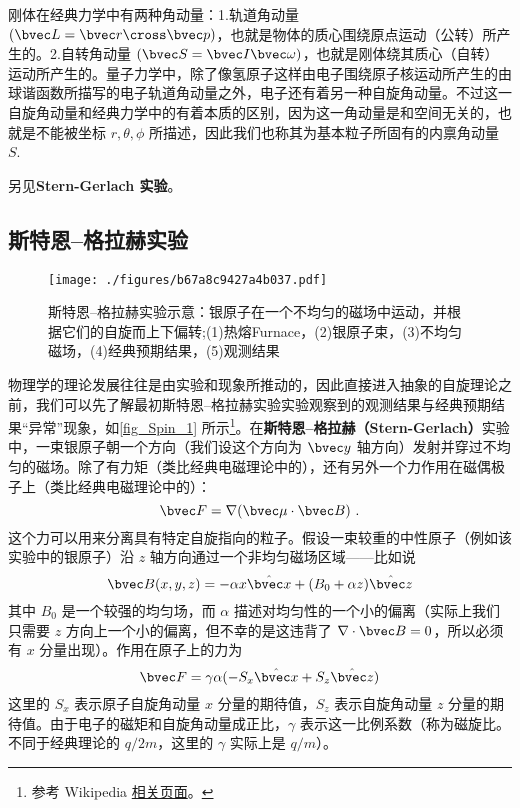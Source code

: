 
\begin{issues}
\issueDraft
\end{issues}


刚体在经典力学中有两种角动量：1.轨道角动量 $(\bvec L = \bvec r\cross\bvec p)$，也就是物体的质心围绕原点运动（公转）所产生的。2.自转角动量 $(\bvec S = \bvec I\bvec\omega)$，也就是刚体绕其质心（自转）运动所产生的。量子力学中，除了像氢原子这样由电子围绕原子核运动所产生的由球谐函数所描写的电子轨道角动量之外，电子还有着另一种自旋角动量。不过这一自旋角动量和经典力学中的有着本质的区别，因为这一角动量是和空间无关的，也就是不能被坐标 $r,\theta,\phi$ 所描述，因此我们也称其为基本粒子所固有的内禀角动量 $S$. 

另见\textbf{Stern-Gerlach 实验}。

\subsection{斯特恩–格拉赫实验}
\begin{figure}[ht]
\centering
\texttt{[image: ./figures/b67a8c9427a4b037.pdf]}
\caption{斯特恩–格拉赫实验示意：银原子在一个不均匀的磁场中运动，并根据它们的自旋而上下偏转;(1)热熔Furnace，(2)银原子束，(3)不均匀磁场，(4)经典预期结果，(5)观测结果} \label{fig_Spin_1}
\end{figure}

物理学的理论发展往往是由实验和现象所推动的，因此直接进入抽象的自旋理论之前，我们可以先了解最初斯特恩–格拉赫实验实验观察到的观测结果与经典预期结果“异常”现象，如\autoref{fig_Spin_1} 所示\footnote{参考 Wikipedia \href{https://en.wikipedia.org/wiki/Stern–Gerlach_experiment}{相关页面}。}。在\textbf{斯特恩–格拉赫（Stern-Gerlach）}实验中，一束银原子朝一个方向（我们设这个方向为 $\bvec y$ 轴方向）发射并穿过不均匀的磁场。除了有力矩（类比经典电磁理论中的），还有另外一个力作用在磁偶极子上（类比经典电磁理论中的）：
\begin{equation}\label{eq_Spin_1}
\bvec F=\nabla(\bvec \mu\cdot \bvec B)~.
\end{equation}
这个力可以用来分离具有特定自旋指向的粒子。假设一束较重的中性原子（例如该实验中的银原子）沿 $z$ 轴方向通过一个非均匀磁场区域——比如说
\begin{equation}\label{eq_Spin_2}
\bvec B(x,y,z)=-\alpha x \hat{\bvec x}+(B_0+\alpha z)\hat {\bvec z}
\end{equation}
其中 $B_0$ 是一个较强的均匀场，而 $\alpha$ 描述对均匀性的一个小的偏离（实际上我们只需要 $z$ 方向上一个小的偏离，但不幸的是这违背了 $\nabla\cdot \bvec B=0$，所以必须有 $x$ 分量出现）。作用在原子上的力为
\begin{equation}
\bvec F=\gamma \alpha (-S_x \hat{\bvec x}+S_z\hat{\bvec z})
\end{equation}
这里的 $S_x$ 表示原子自旋角动量 $x$ 分量的期待值，$S_z$ 表示自旋角动量 $z$ 分量的期待值。由于电子的磁矩和自旋角动量成正比，$\gamma$ 表示这一比例系数（称为磁旋比。不同于经典理论的 $q/2m$，这里的 $\gamma$ 实际上是 $q/m$）。

